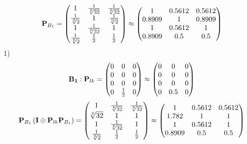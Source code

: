 \documentclass[10pt,a4paper]{article}
\begin{document}
	\[
		\bold{P}_{B_1} = 
		\begin{pmatrix}
			{1} {} & \frac{1} {\sqrt[6]{32}} & \frac{1} {\sqrt[6]{32}} \\
			\frac{1} {\sqrt[6]{2}} & {1} {} & \frac{1} {\sqrt[6]{2}} \\
			{1} {} & \frac{1} {\sqrt[6]{32}} & {1} {} \\
			\frac{1} {\sqrt[6]{2}} & \frac{1} {{2}} & \frac{1} {{2}} \\
		\end{pmatrix}
		\approx
		\begin{pmatrix}
			1        & 0.5612   & 0.5612   \\
			0.8909   & 1        & 0.8909   \\
			1        & 0.5612   & 1        \\
			0.8909   & 0.5      & 0.5      \\
		\end{pmatrix}
	\]
	1)
	\[
		\bold{B_1}: \bold{P}_{lk} = 
		\begin{pmatrix}
			{{0}} {} & {{0}} {} & {{0}} {} \\
			{{0}} {} & {{0}} {} & {{0}} {} \\
			{{0}} {} & {{0}} {} & {{0}} {} \\
			{{0}} {} & \frac{1} {{2}} & {{0}} {} \\
		\end{pmatrix}
		\approx
		\begin{pmatrix}
			0        & 0        & 0        \\
			0        & 0        & 0        \\
			0        & 0        & 0        \\
			0        & 0.5      & 0        \\
		\end{pmatrix}
	\]
	\[
		\bold{P}_{B_1}\left(\bold{I} \oplus \bold{P}_{lk}\bold{P}_{B_1}\right) = 
		\begin{pmatrix}
			{1} {} & \frac{1} {\sqrt[6]{32}} & \frac{1} {\sqrt[6]{32}} \\
			{\sqrt[6]{32}} {} & {1} {} & {1} {} \\
			{1} {} & \frac{1} {\sqrt[6]{32}} & {1} {} \\
			\frac{1} {\sqrt[6]{2}} & \frac{1} {{2}} & \frac{1} {{2}} \\
		\end{pmatrix}
		\approx
		\begin{pmatrix}
			1        & 0.5612   & 0.5612   \\
			1.782    & 1        & 1        \\
			1        & 0.5612   & 1        \\
			0.8909   & 0.5      & 0.5      \\
		\end{pmatrix}
	\]
\end{document}
